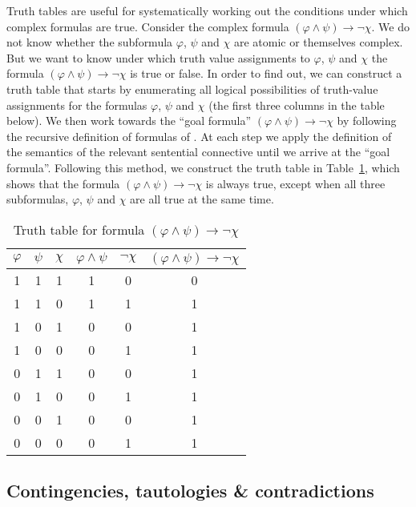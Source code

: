 \documentclass[nobib,nofonts]{tufte-handout}
\newcommand{\proplog}{\acro{PropLog}}
\begin{document}
Truth tables are useful for systematically working out the conditions under which complex formulas are true.
Consider the complex formula $(\varphi \wedge \psi) \rightarrow \neg \chi$.
We do not know whether the subformula $\varphi$, $\psi$ and $\chi$ are atomic or themselves complex.
But we want to know under which truth value assignments to $\varphi$, $\psi$ and $\chi$ the formula $(\varphi \wedge \psi) \rightarrow \neg \chi$ is true or false.
In order to find out, we can construct a truth table that starts by enumerating all logical possibilities of truth-value assignments for the formulas $\varphi$, $\psi$ and $\chi$ (the first three columns in the table below).
We then work towards the ``goal formula'' $(\varphi \wedge \psi) \rightarrow \neg \chi$ by following the recursive definition of formulas of \proplog.
At each step we apply the definition of the semantics of the relevant sentential connective until we arrive at the ``goal formula''.
Following this method, we construct the truth table in Table~\ref{tab:truth-table-contingency}, which shows that the formula $(\varphi \wedge \psi) \rightarrow \neg \chi$ is always true, except when all three subformulas, $\varphi$, $\psi$ and $\chi$ are all true at the same time.

\begin{table}
  \centering
  \begin{center}
    \begin{tabular}{cccccc}
      $\varphi$ & $\psi$ & $\chi$ & $\varphi \wedge \psi$ & $\neg \chi$ & $(\varphi \wedge \psi) \rightarrow \neg \chi$ \\ \midrule
      1  & 1 & 1 & 1 & 0 & 0 \\
      1  & 1 & 0 & 1 & 1 & 1 \\
      1  & 0 & 1 & 0 & 0 & 1 \\
      1  & 0 & 0 & 0 & 1 & 1 \\
      0  & 1 & 1 & 0 & 0 & 1 \\
      0  & 1 & 0 & 0 & 1 & 1 \\
      0  & 0 & 1 & 0 & 0 & 1 \\
      0  & 0 & 0 & 0 & 1 & 1 \\
    \end{tabular}
  \end{center}

  \caption{Truth table for formula $(\varphi \wedge \psi) \rightarrow \neg \chi$}
  \label{tab:truth-table-contingency}
\end{table}

\subsection{Contingencies, tautologies \& contradictions}
\label{sec:cont-taut-}
\end{document}

